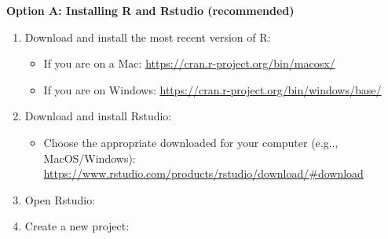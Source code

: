 \documentclass[]{book}
\providecommand{\tightlist}{%
  \setlength{\itemsep}{0pt}\setlength{\parskip}{0pt}}
\begin{document}
\textbf{Option A: Installing R and Rstudio (recommended)}

\begin{enumerate}
\def\labelenumi{\arabic{enumi}.}
\tightlist
\item
  Download and install the most recent version of R:

  \begin{itemize}
  \tightlist
  \item
    If you are on a Mac: \url{https://cran.r-project.org/bin/macosx/}
  \item
    If you are on Windows: \url{https://cran.r-project.org/bin/windows/base/}
  \end{itemize}
\item
  Download and install Rstudio:

  \begin{itemize}
  \tightlist
  \item
    Choose the appropriate downloaded for your computer (e.g.., MacOS/Windows): \url{https://www.rstudio.com/products/rstudio/download/\#download}
  \end{itemize}
\item
  Open Rstudio:
\item
  Create a new project:


\end{enumerate}
\end{document}
